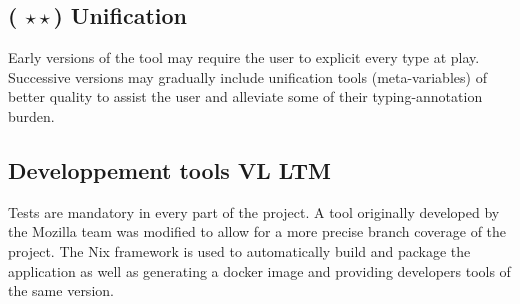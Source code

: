 \documentclass[twocolumn]{article}
\newcommand{\members}[1]{\texorpdfstring{\hfill\scriptsize #1}{}}
\newcommand{\etde}{({\color{Orange} $\star\star$}) }
\begin{document}
\subsection{\etde Unification}
Early versions of the tool may require the user to explicit every type at play.
Successive versions may gradually include unification tools (meta-variables)
of better quality to assist the user and alleviate some of their typing-annotation
burden.

\subsection{Developpement tools \members{VL LTM}}
Tests are mandatory in every part of the project. A tool originally developed by the Mozilla team was modified to allow for a more precise branch coverage of the project.
The Nix framework is used to automatically build and package the application as well as generating a docker image and providing developers tools of the same version.

\end{document}
